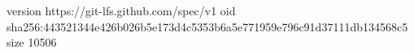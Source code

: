 version https://git-lfs.github.com/spec/v1
oid sha256:443521344e426b026b5e173d4c5353b6a5e771959e796c91d37111db134568c5
size 10506
